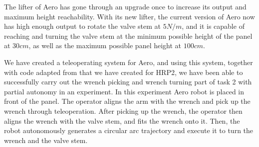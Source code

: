\documentclass{standalone}
\begin{document}
The lifter of Aero has gone through an upgrade once to increase its
output and maximum height reachability. With its new lifter, the current
version of Aero now has high enough output to rotate the valve stem at
$5N/m$, and it is capable of reaching and turning the valve stem at
the minimum possible height of the panel at $30cm$, as well as the
maximum possible panel height at $100cm$.



We have created a teleoperating system for Aero, and using this
system, together with code adapted from that we have created for HRP2,
we have been able to successfully carry out the wrench picking and
wrench turning part of task 2 with partial autonomy in an
experiment. In this experiment Aero robot is placed 
in front of the
panel. The operator aligns the arm with the wrench and pick up the
wrench through teleoperation. After picking up the wrench, the
operator then aligns the wrench with the valve stem, and fits the
wrench onto it. Then, the robot autonomously generates a circular arc
trajectory and execute it to turn the wrench and the valve stem.
\end{document}
